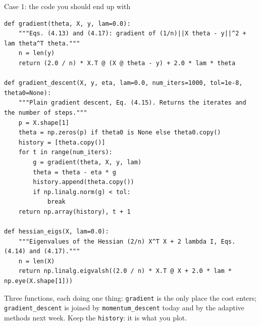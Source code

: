 \documentclass[10pt,aspectratio=169]{beamer}
\begin{document}
\begin{frame}[fragile]{Case 1: the code you should end up with}
\begin{lstlisting}
def gradient(theta, X, y, lam=0.0):
    """Eqs. (4.13) and (4.17): gradient of (1/n)||X theta - y||^2 + lam theta^T theta."""
    n = len(y)
    return (2.0 / n) * X.T @ (X @ theta - y) + 2.0 * lam * theta

def gradient_descent(X, y, eta, lam=0.0, num_iters=1000, tol=1e-8, theta0=None):
    """Plain gradient descent, Eq. (4.15). Returns the iterates and the number of steps."""
    p = X.shape[1]
    theta = np.zeros(p) if theta0 is None else theta0.copy()
    history = [theta.copy()]
    for t in range(num_iters):
        g = gradient(theta, X, y, lam)
        theta = theta - eta * g
        history.append(theta.copy())
        if np.linalg.norm(g) < tol:
            break
    return np.array(history), t + 1

def hessian_eigs(X, lam=0.0):
    """Eigenvalues of the Hessian (2/n) X^T X + 2 lambda I, Eqs. (4.14) and (4.17)."""
    n = len(X)
    return np.linalg.eigvalsh((2.0 / n) * X.T @ X + 2.0 * lam * np.eye(X.shape[1]))
\end{lstlisting}
\footnotesize
Three functions, each doing one thing: \texttt{gradient} is the only place
the cost enters; \texttt{gradient\_descent} is joined by
\texttt{momentum\_descent} today and by the adaptive methods next week.
Keep the \texttt{history}: it is what you plot.
\end{frame}
\end{document}
